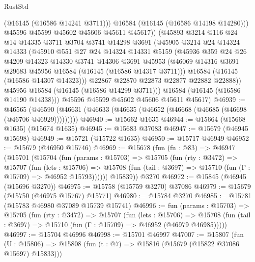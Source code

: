 \begin{lexlean}{RustStd}
\begin{coremodule}
                (@16145 (@16586 @14241 @3711)))
              @16584
              (@16145 (@16586 @14198 @14280)))
            @45596
            @45599
            @45602
            @45606
            @45611
            @45617))
        (@45893
          @3214
          @116
          @24
          @14
          @14335
          @3711
          @3704
          @3741
          @14298
          @3691
          (@45905
            @3214
            @24
            @14324
            @14333
            (@45910
              @551
              @27
              @24
              @14324
              @14331
              @5159
              (@45936
                @359
                @24
                @26
                @4209
                @14323
                @14330
                @3741
                @14306
                @3691
                @45953
                (@46069 @14316 @3691 @29683 @45956 @16584 (@16145 (@16586 @14317 @3711)))
                @16584
                (@16145 (@16586 @14307 @14323)))
              @22867
              @22870
              @22873
              @22877
              @22882
              @22888))
          @45956
          @16584
          (@16145 (@16586 @14299 @3711)))
        @16584
        (@16145 (@16586 @14190 @14338)))
      @45596
      @45599
      @45602
      @45606
      @45611
      @45617)
@46939 := @46565
    (@46590 (@46631 (@46633 (@46635 (@46652 (@46668 (@46685 (@46698 (@46706 @46929)))))))))
@46940 := @15662 @1635
@46944 := @15664 (@15668 @1635) (@15674 @1635)
@46945 := @15683 @37083
@46947 := @15679 (@46945 @15698)
@46949 := @15721 (@15722 @1635)
@46950 := @15717 @46949
@46952 := @15679 (@46950 @15746)
@46969 := @15678
    (fun (fn : @83) =>
    @46947
      (@15701
        (@15704
          (fun (params : @15703) =>
          @15705
            (fun (rty : @3472) =>
            @15707
              (fun (lets : @15706) =>
              @15708 (fun (tail : @3697) => @15710 (fun (Γ : @15709) => @46952 @15793))))))
        @15839))
    @3270
@46972 := @15845 (@46945 (@15696 @3270))
@46975 := @15758 (@15759 @3270) @37086
@46979 := @15679 (@15750 (@46975 @15767) @15771)
@46980 := @15784 @3270
@46985 := @15781 (@15783 @46980 @37089 @15739 @15741)
@46996 := fun (params : @15703) =>
  @15705
    (fun (rty : @3472) =>
    @15707
      (fun (lets : @15706) =>
      @15708 (fun (tail : @3697) => @15710 (fun (Γ : @15709) => @46952 (@46979 @46985)))))
@46997 := @15704 @46996
@46998 := @15701 @46997
@47007 := @15807
    (fun (U : @15806) => @15808 (fun (t : @7) => @15816 (@15679 (@15822 @37086 @15697) @15833)))

\end{coremodule}
\end{lexlean}
